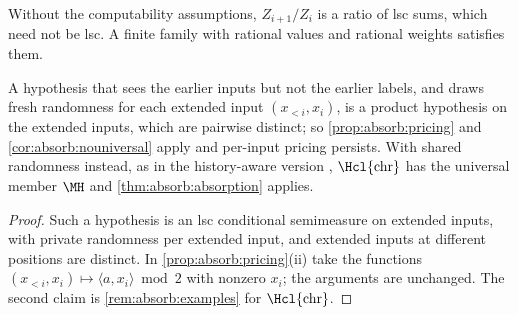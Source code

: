 Without the computability assumptions, $Z_{i+1}/Z_i$ is a ratio of lsc sums, which need not be lsc. A finite family with rational values and rational weights satisfies them.

\begin{proposition}\label{prop:absorb:inputs}
A hypothesis that sees the earlier inputs but not the earlier labels, and draws fresh randomness for each extended input $(x_{<i},x_i)$, is a product hypothesis on the extended inputs, which are pairwise distinct; so \cref{prop:absorb:pricing} and \cref{cor:absorb:nouniversal} apply and per-input pricing persists. With shared randomness instead, as in the history-aware version \SFIhist{}, $\Hcl{\mathrm{chr}}$ has the universal member $\MH$ and \cref{thm:absorb:absorption} applies.
\end{proposition}

\begin{proof} Such a hypothesis is an lsc conditional semimeasure on extended inputs, with private randomness per extended input, and extended inputs at different positions are distinct. In \cref{prop:absorb:pricing}(ii) take the functions $(x_{<i},x_i)\mapsto\langle a,x_i\rangle\bmod2$ with nonzero $x_i$; the arguments are unchanged. The second claim is \cref{rem:absorb:examples} for $\Hcl{\mathrm{chr}}$.
\end{proof}
